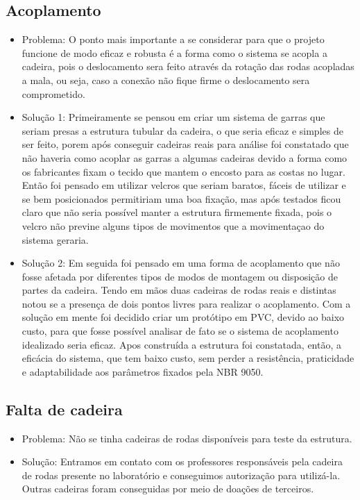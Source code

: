\subsection{Acoplamento}
 \begin{itemize}
  \item Problema: O ponto mais importante a se considerar para que o projeto funcione de modo eficaz e robusta é a forma como o sistema se acopla a cadeira, pois o deslocamento sera feito através da rotação das rodas acopladas a mala, ou seja, caso  a conexão não fique firme o deslocamento sera comprometido.
  \item Solução 1: Primeiramente se pensou em criar um sistema de garras que seriam presas a estrutura tubular da cadeira, o que seria eficaz e simples de ser feito, porem após conseguir cadeiras reais para análise foi constatado que não haveria como acoplar as garras a algumas cadeiras devido a forma como os fabricantes fixam o tecido que mantem o encosto para as costas no lugar. Então foi pensado em utilizar velcros que seriam baratos, fáceis de utilizar e se bem posicionados permitiriam uma boa fixação, mas após testados ficou claro que não seria possível manter a estrutura firmemente fixada, pois o velcro não previne alguns tipos de movimentos que a movimentaçao do sistema geraria.

  \item Solução 2: Em seguida foi pensado em uma forma de acoplamento que não fosse afetada por diferentes tipos de modos de montagem ou disposição de partes da cadeira. Tendo em mãos duas cadeiras de rodas reais e distintas notou se a presença de dois pontos livres para realizar o acoplamento. Com a solução em mente foi decidido criar um protótipo em PVC, devido ao baixo custo, para que fosse possível analisar de fato se o sistema de acoplamento idealizado seria eficaz. Apos construída a estrutura foi constatada, então, a eficácia do sistema, que tem baixo custo, sem perder a resistência, praticidade e adaptabilidade aos parâmetros fixados pela NBR 9050.

 \end{itemize}

\subsection{Falta de cadeira}
 \begin{itemize}
  \item Problema: Não se tinha cadeiras de rodas disponíveis para teste da estrutura.
  \item Solução: Entramos em contato com os professores responsáveis pela cadeira de rodas presente no laboratório e conseguimos autorização para utilizá-la. Outras cadeiras foram conseguidas por meio de doações de terceiros.

 \end{itemize}
